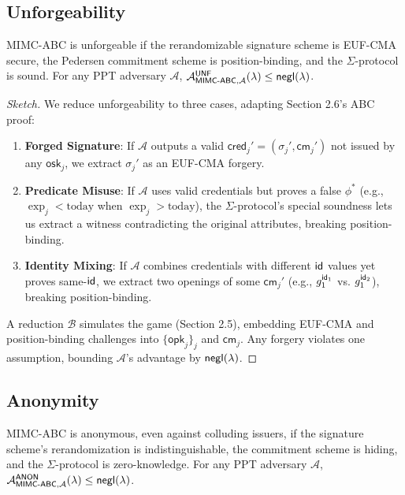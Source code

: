 \subsection{Unforgeability}

\begin{theorem}[Unforgeability]
MIMC-ABC is unforgeable if the rerandomizable signature scheme is EUF-CMA secure, the Pedersen commitment scheme is position-binding, and the $\Sigma$-protocol is sound. For any PPT adversary $\mathcal{A}$, $\mathcal{A}^{\mathsf{UNF}}_{\mathsf{MIMC\text{-}ABC}, \mathcal{A}}(\lambda) \leq \mathsf{negl}(\lambda)$.
\end{theorem}

\begin{proof}[Sketch]
We reduce unforgeability to three cases, adapting Section 2.6’s ABC proof:
\begin{enumerate}
    \item \textbf{Forged Signature}: If $\mathcal{A}$ outputs a valid $\mathsf{cred}_j' = (\sigma_j', \mathsf{cm}_j')$ not issued by any $\mathsf{osk}_j$, we extract $\sigma_j'$ as an EUF-CMA forgery.
    \item \textbf{Predicate Misuse}: If $\mathcal{A}$ uses valid credentials but proves a false $\phi^*$ (e.g., $\exp_j < \text{today}$ when $\exp_j > \text{today}$), the $\Sigma$-protocol’s special soundness lets us extract a witness contradicting the original attributes, breaking position-binding.
    \item \textbf{Identity Mixing}: If $\mathcal{A}$ combines credentials with different $\mathsf{id}$ values yet proves same-$\mathsf{id}$, we extract two openings of some $\mathsf{cm}_j'$ (e.g., $g_1^{\mathsf{id}_1}$ vs. $g_1^{\mathsf{id}_2}$), breaking position-binding.
\end{enumerate}
A reduction $\mathcal{B}$ simulates the game (Section 2.5), embedding EUF-CMA and position-binding challenges into $\{\mathsf{opk}_j\}_j$ and $\mathsf{cm}_j$. Any forgery violates one assumption, bounding $\mathcal{A}$’s advantage by $\mathsf{negl}(\lambda)$.
\end{proof}

\subsection{Anonymity}

\begin{theorem}[Anonymity]
MIMC-ABC is anonymous, even against colluding issuers, if the signature scheme’s rerandomization is indistinguishable, the commitment scheme is hiding, and the $\Sigma$-protocol is zero-knowledge. For any PPT adversary $\mathcal{A}$, $\mathcal{A}^{\mathsf{ANON}}_{\mathsf{MIMC\text{-}ABC}, \mathcal{A}}(\lambda) \leq \mathsf{negl}(\lambda)$.
\end{theorem}

